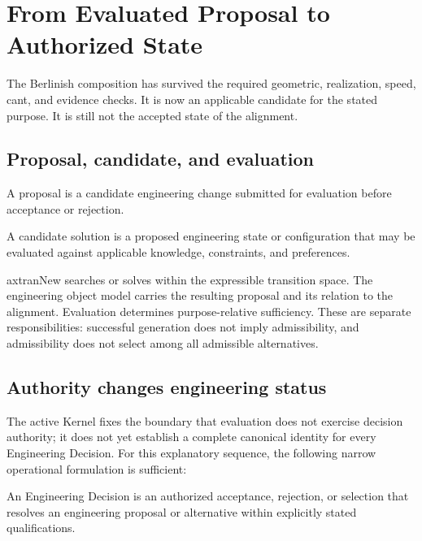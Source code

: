 
\chapter{From Evaluated Proposal to Authorized State}
\label{chap:engineering-decisions}

The Berlinish composition has survived the required geometric, realization,
speed, cant, and evidence checks. It is now an applicable candidate for the
stated purpose. It is still not the accepted state of the alignment.

\section{Proposal, candidate, and evaluation}

\begin{definition}[Proposal]
\label{def:proposal}
A proposal is a candidate engineering change submitted for evaluation before
acceptance or rejection.
\end{definition}

\begin{definition}
\label{def:candidate-solution}
A candidate solution is a proposed engineering state or configuration that
may be evaluated against applicable knowledge, constraints, and preferences.
\end{definition}

axtranNew searches or solves within the expressible transition space. The
engineering object model carries the resulting proposal and its relation to
the alignment. Evaluation determines purpose-relative sufficiency. These are
separate responsibilities: successful generation does not imply admissibility,
and admissibility does not select among all admissible alternatives.

\section{Authority changes engineering status}

The active Kernel fixes the boundary that evaluation does not exercise
decision authority; it does not yet establish a complete canonical identity
for every Engineering Decision. For this explanatory sequence, the following
narrow operational formulation is sufficient:

\begin{definition}
\label{def:engineering-decision}
An Engineering Decision is an authorized acceptance, rejection, or selection
that resolves an engineering proposal or alternative within explicitly stated
qualifications.
\end{definition}

